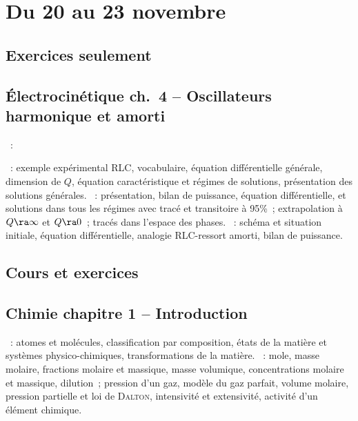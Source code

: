 \documentclass[a4paper, 12pt, final, garamond]{book}
\begin{document}
\setcounter{chapter}{7}

\chapter{Du 20 au 23 novembre}

\section{Exercices seulement}
\section*{Électrocinétique ch.\ 4 -- Oscillateurs harmonique et amorti}

\begin{enumerate}[label=\Roman*, start=2]
	~:
	\begin{enumerate}[label=\Alph*]
		~: exemple expérimental RLC, vocabulaire, équation
		différentielle générale, dimension de $Q$, équation caractéristique et
		régimes de solutions, présentation des solutions générales.
		~: présentation, bilan de puissance,
		équation différentielle, et solutions dans tous les régimes avec tracé et
		transitoire à 95\%~; extrapolation à $Q \ra \infty$ et $Q \ra 0$~; tracés
		dans l'espace des phases.
		~:
		schéma et situation initiale, équation différentielle, analogie RLC-ressort
		amorti, bilan de puissance.
	\end{enumerate}
\end{enumerate}

\section{Cours et exercices}
\section*{Chimie chapitre 1 -- Introduction}
\begin{enumerate}[label=\Roman*]
	~: atomes et molécules, classification par
	composition, états de la matière et systèmes physico-chimiques,
	transformations de la matière.
	~: mole, masse molaire, fractions
	molaire et massique, masse volumique, concentrations molaire et
	massique, dilution~; pression d'un gaz, modèle du gaz parfait, volume
	molaire, pression partielle et loi de \textsc{Dalton}, intensivité et
	extensivité, activité d'un élément chimique.
\end{enumerate}
\end{document}
